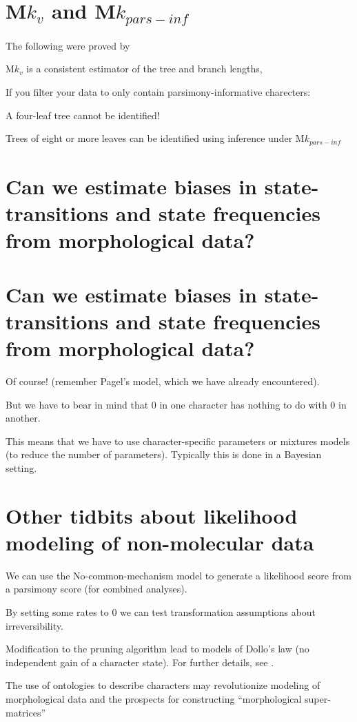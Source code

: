 \documentclass[landscape]{foils}
\begin{document}
\myNewSlide
\section*{M$k_v$ and M$k_{pars-inf}$}
The following were proved by \citet{AllmanHR2010}
\begin{compactenum}
	\item M$k_v$ is a consistent estimator of the tree and branch lengths,
	\item If you filter your data to only contain parsimony-informative charecters:
		\begin{compactenum}
			\item A four-leaf tree cannot be identified!
			\item Trees of eight or more leaves can be identified using inference under M$k_{pars-inf}$
		\end{compactenum}
\end{compactenum}

\myNewSlide
\section*{Can we estimate biases in state-transitions and state frequencies from morphological data?}

\myNewSlide
\section*{Can we estimate biases in state-transitions and state frequencies from morphological data?}
Of course! (remember Pagel's model, which we have already encountered).

But we have to bear in mind that $0$ in one character has nothing to do with $0$ in another.

This means that we have to use character-specific parameters or mixtures models (to reduce the number of parameters).  Typically this is done in a Bayesian setting.

\myNewSlide
\section*{Other tidbits about likelihood modeling of non-molecular data}
\large
\begin{compactenum}
	\item We can use the No-common-mechanism model \citep{TuffleyS1997} to generate a likelihood score from a parsimony score (for combined analyses).
	\item By setting some rates to 0 we can test transformation assumptions about irreversibility.
	\item Modification to the pruning algorithm lead to models of Dollo's law (no independent gain of a character state). For further details, see \citet{AlekseyenkoLS2008}.
	\item The use of ontologies to describe characters may revolutionize modeling of morphological data and the prospects for constructing ``morphological super-matrices''
\end{compactenum}


\myNewSlide

\end{document}
